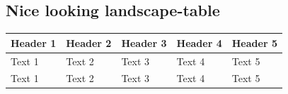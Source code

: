 \documentclass{article}
\begin{document}
\subsection{Nice looking landscape-table}
\begin{landscape}
\begin{longtable}{@{}lllll@{}}
\toprule
\textbf{Header 1} & \textbf{Header 2} & \textbf{Header 3} & \textbf{Header 4} & \textbf{Header 5} \\* \midrule
\endfirsthead
%
\endhead
%
Text 1            & Text 2            & Text 3            & Text 4            & Text 5            \\
Text 1            & Text 2            & Text 3            & Text 4            & Text 5            \\* \bottomrule
\end{longtable}
\end{landscape}

\newpage
\end{document}
